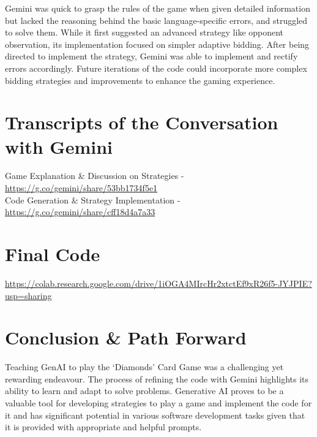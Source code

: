 \documentclass{article}
\begin{document}
Gemini was quick to grasp the rules of the game when given detailed information but lacked the reasoning behind the basic language-specific errors, and struggled to solve them. While it first suggested an advanced strategy like opponent observation, its implementation focused on simpler adaptive bidding. After being directed to implement the strategy, Gemini was able to implement and rectify errors accordingly. Future iterations of the code could incorporate more complex bidding strategies and improvements to enhance the gaming experience. 



\section{Transcripts of the Conversation with Gemini}
Game Explanation \& Discussion on Strategies - \url{https://g.co/gemini/share/53bb1734f5e1} \\
Code Generation \& Strategy Implementation - \url{https://g.co/gemini/share/cff18d4a7a33}

\section{Final Code}
\url{https://colab.research.google.com/drive/1iOGA4MIrcHr2xtctEf9xR26f5-JYJPIE?usp=sharing}

\section{Conclusion \& Path Forward}
Teaching GenAI to play the ‘Diamonds’ Card Game was a challenging yet rewarding endeavour. The process of refining the code with Gemini highlights its ability to learn and adapt to solve problems. Generative AI proves to be a valuable tool for developing strategies to play a game and implement the code for it and has significant potential in various software development tasks given that it is provided with appropriate and helpful prompts.
\end{document}
